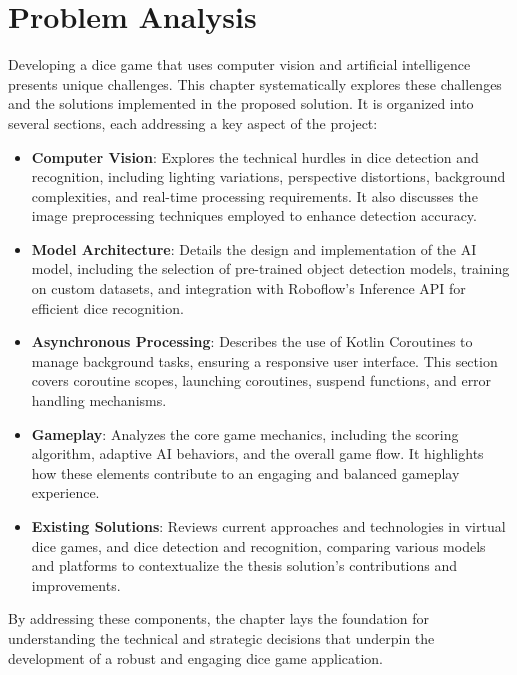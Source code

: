 \chapter{Problem Analysis}
\label{chap:problem-analysis}

Developing a dice game that uses computer vision and artificial intelligence presents unique challenges. This chapter systematically explores these challenges and the solutions implemented in the proposed solution. It is organized into several sections, each addressing a key aspect of the project:

\begin{itemize}
    \item \textbf{Computer Vision}: Explores the technical hurdles in dice detection and recognition, including lighting variations, perspective distortions, background complexities, and real-time processing requirements. It also discusses the image preprocessing techniques employed to enhance detection accuracy.
    
    \item \textbf{Model Architecture}: Details the design and implementation of the AI model, including the selection of pre-trained object detection models, training on custom datasets, and integration with Roboflow’s Inference API for efficient dice recognition.
    
    \item \textbf{Asynchronous Processing}: Describes the use of Kotlin Coroutines to manage background tasks, ensuring a responsive user interface. This section covers coroutine scopes, launching coroutines, suspend functions, and error handling mechanisms.
    
    \item \textbf{Gameplay}: Analyzes the core game mechanics, including the scoring algorithm, adaptive AI behaviors, and the overall game flow. It highlights how these elements contribute to an engaging and balanced gameplay experience.
    
    \item \textbf{Existing Solutions}: Reviews current approaches and technologies in virtual dice games, and dice detection and recognition, comparing various models and platforms to contextualize the thesis solution's contributions and improvements.
\end{itemize}

By addressing these components, the chapter lays the foundation for understanding the technical and strategic decisions that underpin the development of a robust and engaging dice game application.

